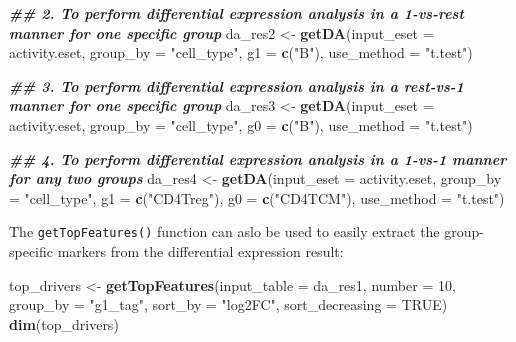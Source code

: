 \documentclass[
  12pt,
]{book}
\newenvironment{Shaded}{\begin{snugshade}}{\end{snugshade}}
\newcommand{\AttributeTok}[1]{\textcolor[rgb]{0.13,0.29,0.53}{#1}}
\newcommand{\ConstantTok}[1]{\textcolor[rgb]{0.56,0.35,0.01}{#1}}
\newcommand{\DecValTok}[1]{\textcolor[rgb]{0.00,0.00,0.81}{#1}}
\newcommand{\DocumentationTok}[1]{\textcolor[rgb]{0.56,0.35,0.01}{\textbf{\textit{#1}}}}
\newcommand{\FunctionTok}[1]{\textcolor[rgb]{0.13,0.29,0.53}{\textbf{#1}}}
\newcommand{\NormalTok}[1]{#1}
\newcommand{\OtherTok}[1]{\textcolor[rgb]{0.56,0.35,0.01}{#1}}
\newcommand{\StringTok}[1]{\textcolor[rgb]{0.31,0.60,0.02}{#1}}
\begin{document}
\begin{Shaded}
\begin{Highlighting}[]
\DocumentationTok{\#\# 2. To perform differential expression analysis in a 1{-}vs{-}rest manner for one specific group}
\NormalTok{da\_res2 }\OtherTok{\textless{}{-}} \FunctionTok{getDA}\NormalTok{(}\AttributeTok{input\_eset =}\NormalTok{ activity.eset, }\AttributeTok{group\_by =} \StringTok{"cell\_type"}\NormalTok{, }\AttributeTok{g1 =} \FunctionTok{c}\NormalTok{(}\StringTok{"B"}\NormalTok{), }\AttributeTok{use\_method =} \StringTok{"t.test"}\NormalTok{)}

\DocumentationTok{\#\# 3. To perform differential expression analysis in a rest{-}vs{-}1 manner for one specific group}
\NormalTok{da\_res3 }\OtherTok{\textless{}{-}} \FunctionTok{getDA}\NormalTok{(}\AttributeTok{input\_eset =}\NormalTok{ activity.eset, }\AttributeTok{group\_by =} \StringTok{"cell\_type"}\NormalTok{, }\AttributeTok{g0 =} \FunctionTok{c}\NormalTok{(}\StringTok{"B"}\NormalTok{), }\AttributeTok{use\_method =} \StringTok{"t.test"}\NormalTok{)}

\DocumentationTok{\#\# 4. To perform differential expression analysis in a 1{-}vs{-}1 manner for any two groups}
\NormalTok{da\_res4 }\OtherTok{\textless{}{-}} \FunctionTok{getDA}\NormalTok{(}\AttributeTok{input\_eset =}\NormalTok{ activity.eset, }\AttributeTok{group\_by =} \StringTok{"cell\_type"}\NormalTok{, }\AttributeTok{g1 =} \FunctionTok{c}\NormalTok{(}\StringTok{"CD4Treg"}\NormalTok{), }\AttributeTok{g0 =} \FunctionTok{c}\NormalTok{(}\StringTok{"CD4TCM"}\NormalTok{), }\AttributeTok{use\_method =} \StringTok{"t.test"}\NormalTok{)}
\end{Highlighting}
\end{Shaded}

The \texttt{getTopFeatures()} function can aslo be used to easily extract the group-specific markers from the differential expression result:

\begin{Shaded}
\begin{Highlighting}[]
\NormalTok{top\_drivers }\OtherTok{\textless{}{-}} \FunctionTok{getTopFeatures}\NormalTok{(}\AttributeTok{input\_table =}\NormalTok{ da\_res1, }\AttributeTok{number =} \DecValTok{10}\NormalTok{, }\AttributeTok{group\_by =} \StringTok{"g1\_tag"}\NormalTok{, }\AttributeTok{sort\_by =} \StringTok{"log2FC"}\NormalTok{, }\AttributeTok{sort\_decreasing =} \ConstantTok{TRUE}\NormalTok{)}
\FunctionTok{dim}\NormalTok{(top\_drivers)}
\end{Highlighting}
\end{Shaded}
\end{document}
